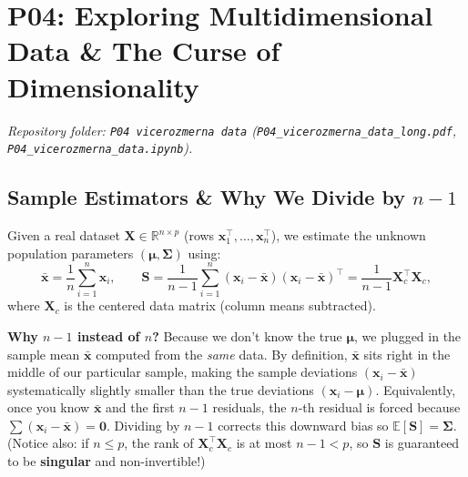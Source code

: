 \documentclass[11pt, a4paper]{article}
\begin{document}
\section{P04: Exploring Multidimensional Data \& The Curse of Dimensionality}
\emph{Repository folder: \texttt{P04 vicerozmerna data} (\texttt{P04\_vicerozmerna\_data\_long.pdf}, \texttt{P04\_vicerozmerna\_data.ipynb}).}

\subsection{Sample Estimators \& Why We Divide by $n-1$}
Given a real dataset $\mathbf{X} \in \mathbb{R}^{n \times p}$ (rows $\mathbf{x}_1^\top, \dots, \mathbf{x}_n^\top$), we estimate the unknown population parameters $(\boldsymbol{\mu}, \boldsymbol{\Sigma})$ using:
\[
    \bar{\mathbf{x}} = \frac{1}{n}\sum_{i=1}^n \mathbf{x}_i,
    \qquad
    \mathbf{S} = \frac{1}{n-1}\sum_{i=1}^n (\mathbf{x}_i - \bar{\mathbf{x}})(\mathbf{x}_i - \bar{\mathbf{x}})^\top
    = \frac{1}{n-1} \mathbf{X}_c^\top \mathbf{X}_c,
\]
where $\mathbf{X}_c$ is the centered data matrix (column means subtracted).

\textbf{Why $n-1$ instead of $n$?} Because we don't know the true $\boldsymbol{\mu}$, we plugged in the sample mean $\bar{\mathbf{x}}$ computed from the \emph{same} data. By definition, $\bar{\mathbf{x}}$ sits right in the middle of our particular sample, making the sample deviations $(\mathbf{x}_i - \bar{\mathbf{x}})$ systematically slightly smaller than the true deviations $(\mathbf{x}_i - \boldsymbol{\mu})$. Equivalently, once you know $\bar{\mathbf{x}}$ and the first $n-1$ residuals, the $n$-th residual is forced because $\sum (\mathbf{x}_i - \bar{\mathbf{x}}) = \mathbf{0}$. Dividing by $n-1$ corrects this downward bias so $\mathbb{E}[\mathbf{S}] = \boldsymbol{\Sigma}$. (Notice also: if $n \le p$, the rank of $\mathbf{X}_c^\top \mathbf{X}_c$ is at most $n-1 < p$, so $\mathbf{S}$ is guaranteed to be \textbf{singular} and non-invertible!)
\end{document}
